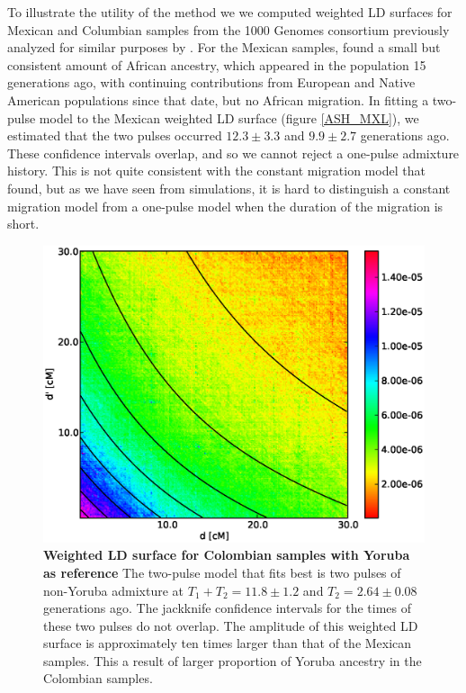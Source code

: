 \documentclass[10pt]{article}
\begin{document}
To illustrate the utility of the method we we computed weighted LD surfaces for
Mexican and Columbian samples from the 1000 Genomes consortium previously
analyzed for similar purposes by \cite{gravel2013reconstructing}. For the
Mexican samples, \cite{gravel2013reconstructing} found a small but consistent
amount of African ancestry, which appeared in the population 15 generations ago,
with continuing contributions from European and Native American populations
since that date, but no African migration. In fitting a two-pulse model to the
Mexican weighted LD surface (figure \ref{ASH_MXL}), we estimated that the two
pulses occurred $12.3\pm3.3$ and $9.9\pm2.7$ generations ago. These confidence
intervals overlap, and so we cannot reject a one-pulse admixture history. This
is not quite consistent with the constant migration model that
\cite{gravel2013reconstructing} found, but as we have seen from simulations, it
is hard to distinguish a constant migration model from a one-pulse model when
the duration of the migration is short.

\begin{figure} \includegraphics[scale=.6]{CLM.eps} \caption{ {\bf Weighted LD
surface for Colombian samples with Yoruba as reference} The two-pulse model that
fits best is two pulses of non-Yoruba admixture at $T_1+T_2=11.8\pm 1.2$ and
$T_2=2.64 \pm 0.08$ generations ago. The jackknife confidence intervals for the
times of these two pulses do not overlap. The amplitude of this weighted LD
surface is approximately ten times larger than that of the Mexican samples. This
a result of larger proportion of Yoruba ancestry in the Colombian samples. }
\label{ASH_CLM} \end{figure}
\end{document}

